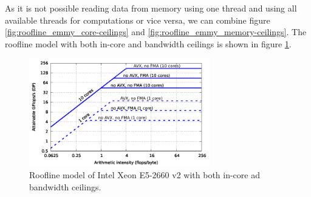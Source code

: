 As it is not possible reading data from memory using one thread and using all available threads for computations or vice versa, we can combine figure \ref{fig:roofline_emmy_core-ceilings} and \ref{fig:roofline_emmy_memory-ceilings}. The roofline model with both in-core and bandwidth ceilings is shown in figure \ref{fig:roofline_emmy_all-ceilings}.

\begin{figure}[ht]
   \centering
   \includegraphics[width=0.7\textwidth,clip=true]{images/roofline/roofline_emmy_Xeon2660v2_all-ceilings.pdf}
   \caption{Roofline model of Intel Xeon E5-2660 v2 with both in-core ad bandwidth ceilings.}
  \label{fig:roofline_emmy_all-ceilings}
\end{figure}

